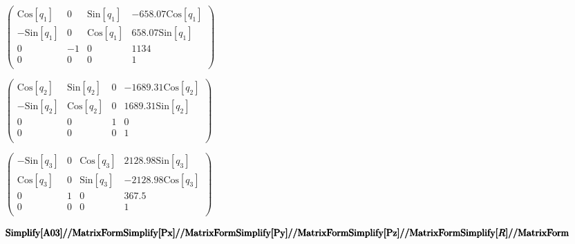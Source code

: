 \documentclass{article}
\begin{document}
\begin{doublespace}
\noindent\(\left(
\begin{array}{cccc}
 \text{Cos}\left[q_1\right] & 0 & \text{Sin}\left[q_1\right] & -658.07 \text{Cos}\left[q_1\right] \\
 -\text{Sin}\left[q_1\right] & 0 & \text{Cos}\left[q_1\right] & 658.07 \text{Sin}\left[q_1\right] \\
 0 & -1 & 0 & 1134 \\
 0 & 0 & 0 & 1 \\
\end{array}
\right)\)
\end{doublespace}

\begin{doublespace}
\noindent\(\left(
\begin{array}{cccc}
 \text{Cos}\left[q_2\right] & \text{Sin}\left[q_2\right] & 0 & -1689.31 \text{Cos}\left[q_2\right] \\
 -\text{Sin}\left[q_2\right] & \text{Cos}\left[q_2\right] & 0 & 1689.31 \text{Sin}\left[q_2\right] \\
 0 & 0 & 1 & 0 \\
 0 & 0 & 0 & 1 \\
\end{array}
\right)\)
\end{doublespace}

\begin{doublespace}
\noindent\(\left(
\begin{array}{cccc}
 -\text{Sin}\left[q_3\right] & 0 & \text{Cos}\left[q_3\right] & 2128.98 \text{Sin}\left[q_3\right] \\
 \text{Cos}\left[q_3\right] & 0 & \text{Sin}\left[q_3\right] & -2128.98 \text{Cos}\left[q_3\right] \\
 0 & 1 & 0 & 367.5 \\
 0 & 0 & 0 & 1 \\
\end{array}
\right)\)
\end{doublespace}

\begin{doublespace}
\noindent\(\pmb{\text{Simplify}[\text{A03}]\text{//}\text{MatrixForm}}\\
\pmb{\text{Simplify}[\text{Px}]\text{//}\text{MatrixForm}}\\
\pmb{\text{Simplify}[\text{Py}]\text{//}\text{MatrixForm}}\\
\pmb{\text{Simplify}[\text{Pz}]\text{//}\text{MatrixForm}}\\
\pmb{\text{Simplify}[R]\text{//}\text{MatrixForm}}\)
\end{doublespace}
\end{document}
